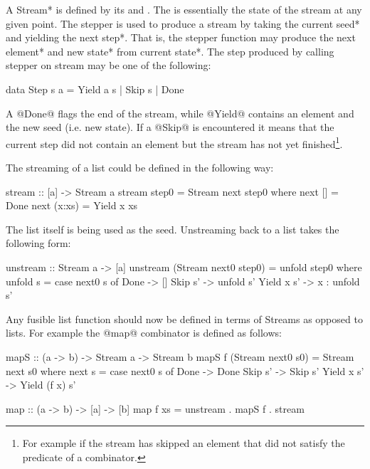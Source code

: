 \documentclass[preamble.tex]{subfiles}
\begin{document}
A \*Stream* is defined by its  and . The  is essentially the state of the stream at any given point. The stepper is used to produce a stream by taking the current \*seed* and yielding the \*next step*. That is, the stepper function may produce the next \*element* and \*new state* from \*current state*. The step produced by calling stepper on stream may be one of the following:


\begin{hscode}
data Step s a = Yield a s
              | Skip s
              | Done
\end{hscode}


A @Done@ flags the end of the stream, while @Yield@ contains an element and the new seed (i.e. new state). If a @Skip@ is encountered it means that the current step did not contain an element but the stream has not yet finished\footnote{For example if the stream has skipped an element that did not satisfy the predicate of a  combinator.}.

The streaming of a list could be defined in the following way:

\begin{hscode}
stream :: [a] -> Stream a
stream step0 = Stream next step0
  where next []     = Done
        next (x:xs) = Yield x xs
\end{hscode}


The list itself is being used as the seed. Unstreaming back to a list takes the following form:


\begin{hscode}
unstream :: Stream a -> [a]
unstream (Stream next0 step0) = unfold step0
  where unfold s = case next0 s of
          Done       -> []
          Skip s'    -> unfold s'
          Yield x s' -> x : unfold s'
\end{hscode}


Any fusible list function should now be defined in terms of Streams as opposed to lists. For example the @map@ combinator is defined as follows:


\begin{hscode}
mapS :: (a -> b) -> Stream a -> Stream b
mapS f (Stream next0 s0) = Stream next s0
  where next s = case next0 s of
    Done       -> Done
    Skip    s' -> Skip        s'
    Yield x s' -> Yield (f x) s'

map :: (a -> b) -> [a] -> [b]
map f xs = unstream . mapS f . stream
\end{hscode}
\end{document}
